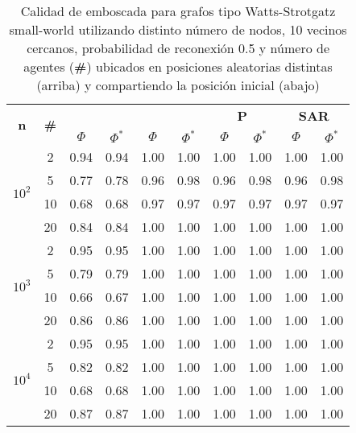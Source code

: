 \begin{table}
	\caption{Calidad de emboscada para grafos tipo Watts-Strotgatz small-world
	utilizando distinto n\'umero de nodos, 10 vecinos cercanos, probabilidad
	de reconexi\'on 0.5 y n\'umero de agentes
	(\textbf{\#}) ubicados en posiciones aleatorias distintas (arriba) y
	compartiendo la posici\'on inicial (abajo)}
	\label{tab:ambush_watts}
	\centering
	\begin{small}
		\setlength{\tabcolsep}{4pt}
		\begin{tabular}{|c|c|cc|cc|cc|cc|}
			\hline
			\multirow{2}{*}{\textbf{n}} &
			\multirow{2}{*}{\textbf{\#}} &
			\multicolumn{2}{c|}{\textbf{\astar}} &
			\multicolumn{2}{c|}{\textbf{\ambush}} &
			\multicolumn{2}{c|}{\textbf{P}} &
			\multicolumn{2}{c|}{\textbf{SAR}}\\
			& & $\Phi$ & $\Phi^*$ & $\Phi$ & $\Phi^*$&
			$\Phi$ & $\Phi^*$& $\Phi$ & $\Phi^*$\\
			\hline
			\multirow{4}{*}{$10^2$}
			 & 2 & 0.94 & 0.94 & 1.00 & 1.00 & 1.00 & 1.00 & 1.00 & 1.00\\
			 & 5 & 0.77 & 0.78 & 0.96 & 0.98 & 0.96 & 0.98 & 0.96 & 0.98\\
			 & 10 & 0.68 & 0.68 & 0.97 & 0.97 & 0.97 & 0.97 & 0.97 & 0.97\\
			 & 20 & 0.84 & 0.84 & 1.00 & 1.00 & 1.00 & 1.00 & 1.00 & 1.00\\
			\hline
			\multirow{4}{*}{$10^3$}
			 & 2 & 0.95 & 0.95 & 1.00 & 1.00 & 1.00 & 1.00 & 1.00 & 1.00\\
			 & 5 & 0.79 & 0.79 & 1.00 & 1.00 & 1.00 & 1.00 & 1.00 & 1.00\\
			 & 10 & 0.66 & 0.67 & 1.00 & 1.00 & 1.00 & 1.00 & 1.00 & 1.00\\
			 & 20 & 0.86 & 0.86 & 1.00 & 1.00 & 1.00 & 1.00 & 1.00 & 1.00\\
			 \hline
			\multirow{4}{*}{$10^4$}
			 & 2 & 0.95 & 0.95 & 1.00 & 1.00 & 1.00 & 1.00 & 1.00 & 1.00\\
			 & 5 & 0.82 & 0.82 & 1.00 & 1.00 & 1.00 & 1.00 & 1.00 & 1.00\\
			 & 10 & 0.68 & 0.68 & 1.00 & 1.00 & 1.00 & 1.00 & 1.00 & 1.00\\
			 & 20 & 0.87 & 0.87 & 1.00 & 1.00 & 1.00 & 1.00 & 1.00 & 1.00\\
			 \hline
		\end{tabular}
		

\end{small}
\end{table}
